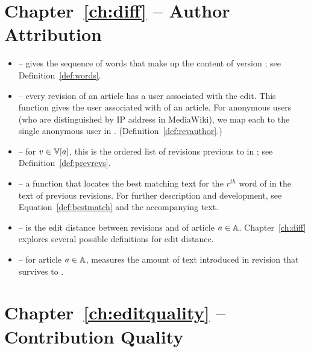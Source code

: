 \section{Chapter~\ref{ch:diff} -- Author Attribution}

\begin{itemize}

\item \words{\version{}} -- gives the sequence of words that make
    up the content of version \version{}; see
    Definition~\ref{def:words}.

\item \revauthor{\version{}} -- every revision of an article has
    a user associated with the edit.
    This function gives the user associated with \version{} of
    an article.
    For anonymous users (who are distinguished by IP address in
    MediaWiki), we map each to the single anonymous user in \users.
    (Definition~\ref{def:revauthor}.)

\item \prevrevs{\version{}} -- for $\version{} \in \versions{a}$,
    this is the ordered list of revisions previous to \version{}
    in ; see Definition~\ref{def:prevrevs}.

\item {} -- a function
    that locates the best matching text for the $r^{th}$ word of
     in the text of previous revisions.
    For further description and development, see
    Equation~\ref{def:bestmatch} and the accompanying text.

\item {} -- is the edit distance between revisions
     and  of article $a \in \mathbb{A}$.
    Chapter~\ref{ch:diff} explores several possible definitions for
    edit distance.

\item {} -- for article $a \in \mathbb{A}$, measures the
    amount of text introduced in revision 
    that survives to .

\end{itemize}

\section{Chapter~\ref{ch:editquality} -- Contribution Quality}

